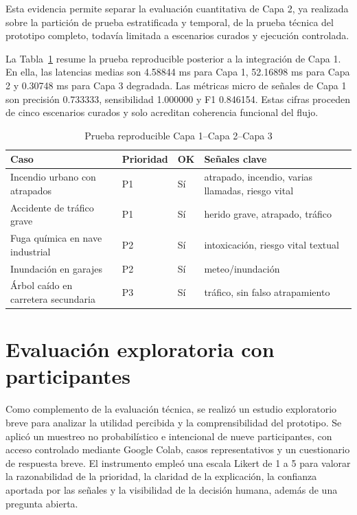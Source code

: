 Esta evidencia permite separar la evaluación cuantitativa de Capa 2, ya realizada sobre la partición de prueba estratificada y
temporal, de la prueba técnica del prototipo completo, todavía limitada a
escenarios curados y ejecución controlada.

La Tabla~\ref{tab:9-e2e-capa1-capa2} resume la prueba reproducible posterior a la
integración de Capa 1. En ella, las latencias medias son 4.58844 ms para Capa 1,
52.16898 ms para Capa 2 y 0.30748 ms para Capa 3 degradada. Las métricas micro de
señales de Capa 1 son precisión 0.733333, sensibilidad 1.000000 y F1 0.846154. Estas cifras
proceden de cinco escenarios curados y solo acreditan coherencia funcional del flujo.

\begin{table}[ht]
\centering
\caption{Prueba reproducible Capa 1--Capa 2--Capa 3}
\label{tab:9-e2e-capa1-capa2}
\small
\begin{tabularx}{\textwidth}{|p{4.0cm}|p{1.8cm}|p{0.9cm}|X|}
\hline
\textbf{Caso} & \textbf{Prioridad} & \textbf{OK} & \textbf{Señales clave} \\ \hline
Incendio urbano con atrapados & P1 & Sí & atrapado, incendio, varias llamadas, riesgo vital \\ \hline
Accidente de tráfico grave & P1 & Sí & herido grave, atrapado, tráfico \\ \hline
Fuga química en nave industrial & P2 & Sí & intoxicación, riesgo vital textual \\ \hline
Inundación en garajes & P2 & Sí & meteo/inundación \\ \hline
Árbol caído en carretera secundaria & P3 & Sí & tráfico, sin falso atrapamiento \\ \hline
\end{tabularx}
\end{table}

\section{Evaluación exploratoria con participantes}

Como complemento de la evaluación técnica, se realizó un estudio exploratorio breve
para analizar la utilidad percibida y la comprensibilidad del prototipo. Se aplicó un
muestreo no probabilístico e intencional de nueve participantes, con acceso controlado
mediante Google Colab, casos representativos y un cuestionario de respuesta breve. El
instrumento empleó una escala Likert de 1 a 5 para valorar la razonabilidad de la
prioridad, la claridad de la explicación, la confianza aportada por las señales y la
visibilidad de la decisión humana, además de una pregunta abierta.

